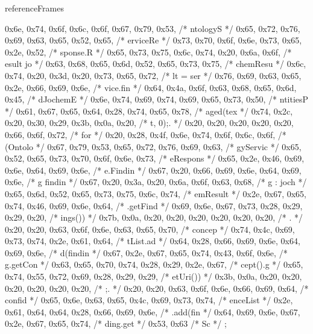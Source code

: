 \begin{chunk}{referenceFrames}
{{{{{0x6e, 0x74, 0x6f, 0x6c, 0x6f, 0x67, 0x79, 0x53, /* ntologyS */
0x65, 0x72, 0x76, 0x69, 0x63, 0x65, 0x52, 0x65, /* erviceRe */
0x73, 0x70, 0x6f, 0x6e, 0x73, 0x65, 0x2e, 0x52, /* sponse.R */
0x65, 0x73, 0x75, 0x6c, 0x74, 0x20, 0x6a, 0x6f, /* esult jo */
0x63, 0x68, 0x65, 0x6d, 0x52, 0x65, 0x73, 0x75, /* chemResu */
0x6c, 0x74, 0x20, 0x3d, 0x20, 0x73, 0x65, 0x72, /* lt = ser */
0x76, 0x69, 0x63, 0x65, 0x2e, 0x66, 0x69, 0x6e, /* vice.fin */
0x64, 0x4a, 0x6f, 0x63, 0x68, 0x65, 0x6d, 0x45, /* dJochemE */
0x6e, 0x74, 0x69, 0x74, 0x69, 0x65, 0x73, 0x50, /* ntitiesP */
0x61, 0x67, 0x65, 0x64, 0x28, 0x74, 0x65, 0x78, /* aged(tex */
0x74, 0x2c, 0x20, 0x30, 0x29, 0x3b, 0x0a, 0x20, /* t, 0);.  */
0x20, 0x20, 0x20, 0x20, 0x20, 0x66, 0x6f, 0x72, /*      for */
0x20, 0x28, 0x4f, 0x6e, 0x74, 0x6f, 0x6c, 0x6f, /*  (Ontolo */
0x67, 0x79, 0x53, 0x65, 0x72, 0x76, 0x69, 0x63, /* gyServic */
0x65, 0x52, 0x65, 0x73, 0x70, 0x6f, 0x6e, 0x73, /* eRespons */
0x65, 0x2e, 0x46, 0x69, 0x6e, 0x64, 0x69, 0x6e, /* e.Findin */
0x67, 0x20, 0x66, 0x69, 0x6e, 0x64, 0x69, 0x6e, /* g findin */
0x67, 0x20, 0x3a, 0x20, 0x6a, 0x6f, 0x63, 0x68, /* g : joch */
0x65, 0x6d, 0x52, 0x65, 0x73, 0x75, 0x6c, 0x74, /* emResult */
0x2e, 0x67, 0x65, 0x74, 0x46, 0x69, 0x6e, 0x64, /* .getFind */
0x69, 0x6e, 0x67, 0x73, 0x28, 0x29, 0x29, 0x20, /* ings())  */
0x7b, 0x0a, 0x20, 0x20, 0x20, 0x20, 0x20, 0x20, /* {.       */
0x20, 0x20, 0x63, 0x6f, 0x6e, 0x63, 0x65, 0x70, /*   concep */
0x74, 0x4c, 0x69, 0x73, 0x74, 0x2e, 0x61, 0x64, /* tList.ad */
0x64, 0x28, 0x66, 0x69, 0x6e, 0x64, 0x69, 0x6e, /* d(findin */
0x67, 0x2e, 0x67, 0x65, 0x74, 0x43, 0x6f, 0x6e, /* g.getCon */
0x63, 0x65, 0x70, 0x74, 0x28, 0x29, 0x2e, 0x67, /* cept().g */
0x65, 0x74, 0x55, 0x72, 0x69, 0x28, 0x29, 0x29, /* etUri()) */
0x3b, 0x0a, 0x20, 0x20, 0x20, 0x20, 0x20, 0x20, /* ;.       */
0x20, 0x20, 0x63, 0x6f, 0x6e, 0x66, 0x69, 0x64, /*   confid */
0x65, 0x6e, 0x63, 0x65, 0x4c, 0x69, 0x73, 0x74, /* enceList */
0x2e, 0x61, 0x64, 0x64, 0x28, 0x66, 0x69, 0x6e, /* .add(fin */
0x64, 0x69, 0x6e, 0x67, 0x2e, 0x67, 0x65, 0x74, /* ding.get */
0x53, 0x63                                      /* Sc */
};

}}}}}
\end{chunk}
